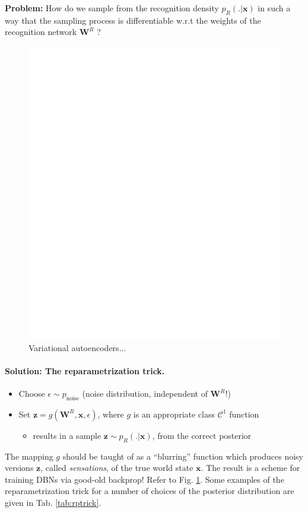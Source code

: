 \documentclass[10pt,letterpaper]{article}
\def\z{\mathbf{z}}
\def\W{\mathbf{W}}
\def\x{\mathbf{x}}
\begin{document}
\begin{mdframed}
  \textbf{Problem:} How do we sample from the recognition density $p_R(.|\x)$ in such a way that the sampling process is differentiable w.r.t the weights of the recognition network $\W^R$ ?
\end{mdframed}

\begin{figure}[!tb]
  \centering
  \includegraphics[width=.8\linewidth]{vae.pdf}
  \caption{Variational autoencoders...}
  \label{fig:vae}
\end{figure}

\paragraph{Solution: The reparametrization trick.}
\begin{itemize}
\item Choose $\epsilon \sim p_{\text{noise}}$ (noise distribution, independent of $\W^R$!)
\item Set $\z = g(\W^{R}, \x, \epsilon)$, where $g$ is an appropriate class $\mathcal C^1$ function
  \begin{itemize}
  \item results in a sample $\z \sim p_R(.|\x)$, from the correct
    posterior
    \end{itemize}
\end{itemize}
The mapping $g$ should be taught of as a ``blurring'' function which produces noisy versions $\z$,
called \textit{sensations}, of the true world state $\x$.
The result is a scheme for training DBNs via good-old backprop!
Refer to Fig. \ref{fig:vae}. Some examples of the reparametrization trick for a number of
choices of the posterior distribution are given in Tab. \ref{tab:rptrick}.
\end{document}
